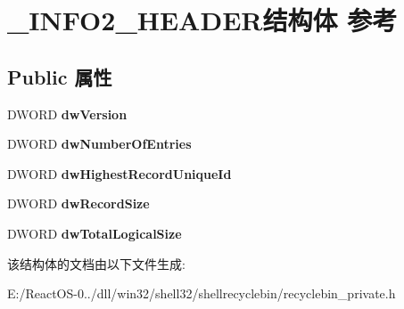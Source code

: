 \hypertarget{struct___i_n_f_o2___h_e_a_d_e_r}{}\section{\+\_\+\+I\+N\+F\+O2\+\_\+\+H\+E\+A\+D\+E\+R结构体 参考}
\label{struct___i_n_f_o2___h_e_a_d_e_r}
\subsection*{Public 属性}
\begin{DoxyCompactItemize}
\item 
\mbox{\label{struct___i_n_f_o2___h_e_a_d_e_r_a36693a6d10a78736087d94a6968764af}} 
D\+W\+O\+RD {\bfseries dw\+Version}
\item 
\mbox{\label{struct___i_n_f_o2___h_e_a_d_e_r_a5f278df015e457841e7ef3ed5bf4a821}} 
D\+W\+O\+RD {\bfseries dw\+Number\+Of\+Entries}
\item 
\mbox{\label{struct___i_n_f_o2___h_e_a_d_e_r_af868169bffa11b50119fb6c2b67bc866}} 
D\+W\+O\+RD {\bfseries dw\+Highest\+Record\+Unique\+Id}
\item 
\mbox{\label{struct___i_n_f_o2___h_e_a_d_e_r_aaed4e3a7700725b93b8363aa43d2b9e1}} 
D\+W\+O\+RD {\bfseries dw\+Record\+Size}
\item 
\mbox{\label{struct___i_n_f_o2___h_e_a_d_e_r_a26af9270f07d13118d29cffd38a07455}} 
D\+W\+O\+RD {\bfseries dw\+Total\+Logical\+Size}
\end{DoxyCompactItemize}


该结构体的文档由以下文件生成\+:\begin{DoxyCompactItemize}
\item 
E\+:/\+React\+O\+S-\/0../dll/win32/shell32/shellrecyclebin/recyclebin\+\_\+private.\+h\end{DoxyCompactItemize}
